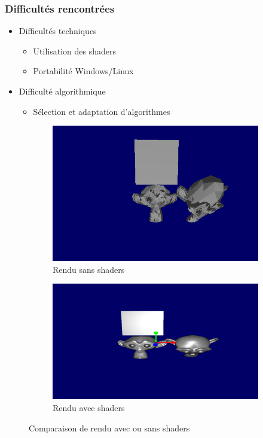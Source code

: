 \documentclass{beamer}
\begin{document}
\begin{frame}
\frametitle{Difficultés rencontrées}
\begin{itemize}[label=$\bullet$]
\item Difficultés techniques
\begin{itemize}[label=$\circ$]
\item Utilisation des shaders
\item Portabilité Windows/Linux
\end{itemize}
\item Difficulté algorithmique %
\begin{itemize}[label=$\circ$]
\item Sélection et adaptation d'algorithmes
\end{itemize}
\end{itemize}

\begin{figure}
\centering
\begin{subfigure}{.4\textwidth}
  \centering
  \includegraphics[width=1\linewidth]{rendu_sans_shader.png}
  \caption{Rendu sans shaders}
\end{subfigure}
\begin{subfigure}{.4\textwidth}
  \centering
  \includegraphics[width=1\linewidth]{singe_shaders.png}
  \caption{Rendu avec shaders}
\end{subfigure}
\caption{Comparaison de rendu avec ou sans shaders}
\end{figure}


\end{frame}
\end{document}
